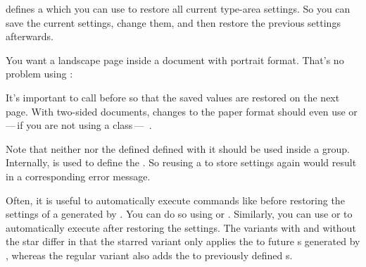 \begin{Declaration}
\end{Declaration}
 defines a  which you can use to
restore all current type-area settings. So you can save the current settings,
change them, and then restore the previous settings afterwards.

\begin{Example}
  You want a landscape page inside a document with portrait format. That's
  no problem using :
  It's important to call 
  before  so that the saved values are restored on the
  next page. With two-sided documents, changes to the paper format should even
  use 
  or\,---\,if you are not using a \KOMAScript{}
  class\,---\,%
  .%
\end{Example}

Note that neither  nor the defined
 defined with it should be used inside a group.
Internally,
 is
used to define the . So reusing a
 to store settings again would result in a
corresponding error message.

Often, it is useful to automatically
execute commands like  before
restoring the settings of a  generated by .
You can do so using  or .
Similarly, you can use  or 
to automatically execute  after restoring the settings. The
variants with and without the star differ in that the starred variant only
applies the  to future s generated by
, whereas the regular variant also adds the  to
previously defined s.%
\EndIndexGroup


